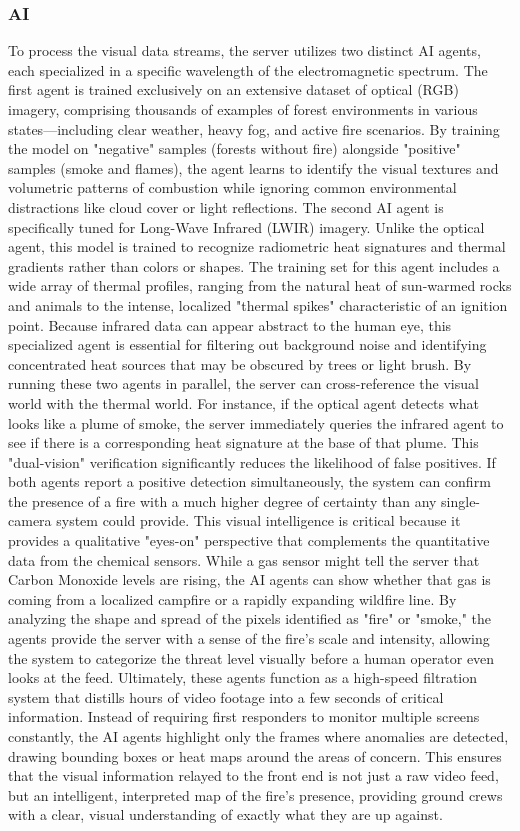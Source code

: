 \documentclass[journal, onecolumn]{IEEEtran}
\begin{document}
\subsubsection{AI}
To process the visual data streams, the server utilizes two distinct AI agents, each specialized in a specific wavelength of the electromagnetic spectrum. The first agent is trained exclusively on an extensive dataset of optical (RGB) imagery, comprising thousands of examples of forest environments in various states—including clear weather, heavy fog, and active fire scenarios. By training the model on "negative" samples (forests without fire) alongside "positive" samples (smoke and flames), the agent learns to identify the visual textures and volumetric patterns of combustion while ignoring common environmental distractions like cloud cover or light reflections.
The second AI agent is specifically tuned for Long-Wave Infrared (LWIR) imagery. Unlike the optical agent, this model is trained to recognize radiometric heat signatures and thermal gradients rather than colors or shapes. The training set for this agent includes a wide array of thermal profiles, ranging from the natural heat of sun-warmed rocks and animals to the intense, localized "thermal spikes" characteristic of an ignition point. Because infrared data can appear abstract to the human eye, this specialized agent is essential for filtering out background noise and identifying concentrated heat sources that may be obscured by trees or light brush.
By running these two agents in parallel, the server can cross-reference the visual world with the thermal world. For instance, if the optical agent detects what looks like a plume of smoke, the server immediately queries the infrared agent to see if there is a corresponding heat signature at the base of that plume. This "dual-vision" verification significantly reduces the likelihood of false positives. If both agents report a positive detection simultaneously, the system can confirm the presence of a fire with a much higher degree of certainty than any single-camera system could provide.
This visual intelligence is critical because it provides a qualitative "eyes-on" perspective that complements the quantitative data from the chemical sensors. While a gas sensor might tell the server that Carbon Monoxide levels are rising, the AI agents can show whether that gas is coming from a localized campfire or a rapidly expanding wildfire line. By analyzing the shape and spread of the pixels identified as "fire" or "smoke," the agents provide the server with a sense of the fire's scale and intensity, allowing the system to categorize the threat level visually before a human operator even looks at the feed.
Ultimately, these agents function as a high-speed filtration system that distills hours of video footage into a few seconds of critical information. Instead of requiring first responders to monitor multiple screens constantly, the AI agents highlight only the frames where anomalies are detected, drawing bounding boxes or heat maps around the areas of concern. This ensures that the visual information relayed to the front end is not just a raw video feed, but an intelligent, interpreted map of the fire's presence, providing ground crews with a clear, visual understanding of exactly what they are up against.
\end{document}
